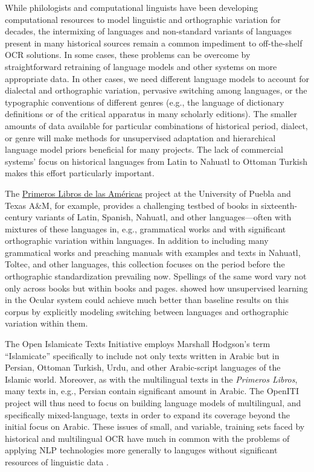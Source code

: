 \documentclass[twoside,11pt]{report}
\begin{document}
While philologists and computational linguists have been developing computational resources to model linguistic and orthographic variation for decades, the intermixing of languages and non-standard variants of languages present in many historical sources remain a common impediment to off-the-shelf OCR solutions. In some cases, these problems can be overcome by straightforward retraining of language models and other systems on more appropriate data. In other cases, we need different language models to account for dialectal and orthographic variation, pervasive switching among languages, or the typographic conventions of different genres (e.g., the language of dictionary definitions or of the critical apparatus in many scholarly editions). The smaller amounts of data available for particular combinations of historical period, dialect, or genre will make methods for unsupervised adaptation and hierarchical language model priors beneficial for many projects. The lack of commercial systems' focus on historical languages from Latin to Nahuatl to Ottoman Turkish makes this effort particularly important.

The \href{http://primeroslibros.org/}{Primeros Libros de las Américas} project at the University of Puebla and Texas A\&M, for example, provides a challenging testbed of books in sixteenth-century variants of Latin, Spanish, Nahuatl, and other languages---often with mixtures of these languages in, e.g., grammatical works and with significant orthographic variation within languages. In addition to including many grammatical works and preaching manuals with examples and texts in Nahuatl, Toltec, and other languages, this collection focuses on the period before the orthographic standardization prevailing now. Spellings of the same word vary not only across books but within books and pages. \cite{garrette15:_unsup_code_switc_multil_histor_docum_trans} showed how unsupervised learning in the Ocular system could achieve much better than baseline results on this corpus by explicitly modeling switching between languages and orthographic variation within them.

The Open Islamicate Texts Initiative \citep[OpenITI:][]{miller18:_digit_textual_herit_premod_islam_world} employs Marshall Hodgson's \citeyearpar{hodgson74:_ventur_islam} term ``Islamicate'' specifically to include not only texts written in Arabic but in Persian, Ottoman Turkish, Urdu, and other Arabic-script languages of the Islamic world. Moreover, as with the multilingual texts in the \emph{Primeros Libros}, many texts in, e.g., Persian contain significant amount in Arabic. The OpenITI project will thus need to focus on building language models of multilingual, and specifically mixed-language, texts in order to expand its coverage beyond the initial focus on Arabic.  These issues of small, and variable, training sets faced by historical and multilingual OCR have much in common with the problems of applying NLP technologies more generally to languges without significant resources of linguistic data \citep{mager18:_chall_languag_techn_indig_languag_americ}. 
\end{document}
